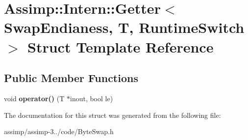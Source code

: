 \hypertarget{struct_assimp_1_1_intern_1_1_getter}{\section{Assimp\+:\+:Intern\+:\+:Getter$<$ Swap\+Endianess, T, Runtime\+Switch $>$ Struct Template Reference}
\label{struct_assimp_1_1_intern_1_1_getter}
}
\subsection*{Public Member Functions}
\begin{DoxyCompactItemize}
\item 
\hypertarget{struct_assimp_1_1_intern_1_1_getter_a73b63da5d00911e9c11664244a53b17b}{void {\bfseries operator()} (T $\ast$inout, bool le)}\label{struct_assimp_1_1_intern_1_1_getter_a73b63da5d00911e9c11664244a53b17b}

\end{DoxyCompactItemize}


The documentation for this struct was generated from the following file\+:\begin{DoxyCompactItemize}
\item 
assimp/assimp-\/3../code/Byte\+Swap.\+h\end{DoxyCompactItemize}
